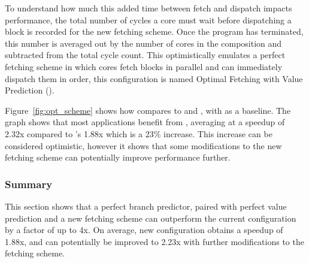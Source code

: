 To understand how much this added time between fetch and dispatch impacts performance, the total number of cycles a core must wait before dispatching a block is recorded for the new fetching scheme.
Once the program has terminated, this number is averaged out by the number of cores in the composition and subtracted from the total cycle count.
This optimistically emulates a perfect fetching scheme in which cores fetch blocks in parallel and can immediately dispatch them in order, this configuration is named Optimal Fetching with Value Prediction (\optvp).

Figure~\ref{fig:opt_scheme} shows how \optvp{} compares to \vp{} and \nfvp{}, with \novp{} as a baseline.
The graph shows that most applications benefit from \optvp{}, averaging at a speedup of 2.32x compared to \nfvp's 1.88x which is a 23\% increase.
This increase can be considered optimistic, however it shows that some modifications to the new fetching scheme can potentially improve performance further.

\subsubsection{Summary}

This section shows that a perfect branch predictor, paired with perfect value prediction and a new fetching scheme can outperform the current configuration by a factor of up to 4x.
On average, new configuration obtains a speedup of 1.88x, and can potentially be improved to 2.23x with further modifications to the fetching scheme.

